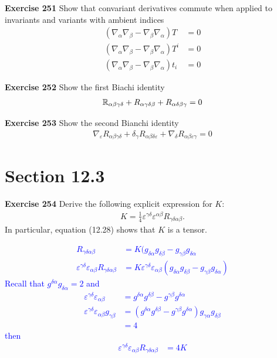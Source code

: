\documentclass[12pt,a4paper]{report}
\newcommand{\BLUE}[1]{\textcolor{blue}{#1}}
\begin{document}
\begin{description}
\item \textbf{Exercise 251} Show that convariant derivatives commute when applied to invariants and variants with ambient indices
\begin{align*}
	(\nabla_\alpha\nabla_\beta-\nabla_\beta\nabla_\alpha) T &=0\\
	(\nabla_\alpha\nabla_\beta-\nabla_\beta\nabla_\alpha) T^i &= 0\\
	(\nabla_\alpha\nabla_\beta-\nabla_\beta\nabla_\alpha) t_i &= 0
\end{align*}

\item \textbf{Exercise 252} Show the first Biachi identity
\begin{align*}
	\mathbb{R}_{\alpha\beta\gamma\delta} + R_{\alpha\gamma\delta\beta} + R_{\alpha\delta\beta\gamma} = 0
\end{align*}

\item \textbf{Exercise 253} Show the second Bianchi identity
\begin{align*}
	\nabla_\varepsilon R_{\alpha\beta\gamma\delta} + \delta_\gamma R_{\alpha\beta\delta\varepsilon} + \nabla_\delta R_{\alpha\beta\varepsilon\gamma} = 0
\end{align*}

\section*{Section 12.3}
\item \textbf{Exercise 254} Derive the following explicit expression for $K$:
\begin{align*}
	K = \frac{1}{4}\varepsilon^{\gamma\delta}\varepsilon^{\alpha\beta} R_{\gamma\delta\alpha\beta}.
\end{align*}In particular, equation (12.28) shows that $K$ is a tensor.

\BLUE{
\begin{align*}
	R_{\gamma\delta\alpha\beta} &= K(g_{\delta\alpha}g_{\delta\beta}-g_{\gamma\beta}g_{\delta\alpha} \\
	\varepsilon^{\gamma\delta}\varepsilon_{\alpha\beta}R_{\gamma\delta\alpha\beta} &= K	\varepsilon^{\gamma\delta}\varepsilon_{\alpha\beta}(g_{\delta\alpha}g_{\delta\beta}-g_{\gamma\beta}g_{\delta\alpha}) 
\end{align*}Recall that $g^{\delta\alpha}g_{\delta\alpha}=2$ and 
\begin{align*}
	\varepsilon^{\gamma\delta}\varepsilon_{\alpha\beta} &= 	g^{\delta\alpha}g^{\delta\beta}-g^{\gamma\beta}g^{\delta\alpha} \\
	\varepsilon^{\gamma\delta}\varepsilon_{\alpha\beta}g_{\gamma\beta} &= 	(g^{\delta\alpha}g^{\delta\beta}-g^{\gamma\beta}g^{\delta\alpha}) g_{\gamma\alpha}g_{\delta\beta} \\
	&= 4
\end{align*}then
\begin{align*}
	\varepsilon^{\gamma\delta}\varepsilon_{\alpha\beta}R_{\gamma\delta\alpha\beta} &= 4K	
\end{align*}
}


\end{description}
\end{document}
